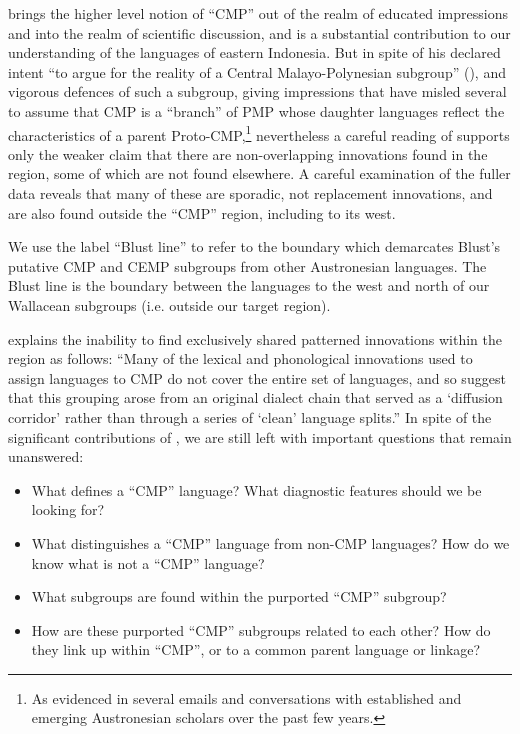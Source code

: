 \citet{Blust1993} brings the higher level notion of “CMP”
out of the realm of educated impressions
and into the realm of scientific discussion,
and is a substantial contribution to our understanding
of the  languages of eastern Indonesia.
But in spite of his declared intent
“to argue for the reality of a Central Malayo-Polynesian subgroup”
(\citeyear[244]{Blust1993}),
and vigorous defences of such a subgroup,
giving impressions that have misled several to assume that CMP
is a “branch” of PMP whose daughter languages reflect
the characteristics of a parent Proto-CMP,\footnote{
		As evidenced in several emails
		and conversations with established
		and emerging Austronesian scholars over the past few years.}
nevertheless a careful reading of \citet{Blust1993} supports only
the weaker claim that there are non-overlapping innovations found in the region,
some of which are not found elsewhere.
A careful examination of the fuller data reveals that many of these are sporadic,
not replacement innovations,
and are also found outside the “CMP” region,
including to its west.

We use the label “Blust line”
to refer to the boundary which demarcates Blust's
putative CMP and CEMP subgroups
from other Austronesian languages.
The Blust line is the boundary
between the languages to the west
and north of our Wallacean subgroups (i.e.
outside our target region).

\citet[32]{Blust2013} explains the inability to find exclusively
shared patterned innovations within the region as follows: “Many of the lexical
and phonological innovations used to assign languages
to CMP do not cover the entire set of languages,
and so suggest that this grouping arose from an original dialect chain
that served as a ‘diffusion corridor’ rather than through a series of ‘clean’ language splits.”
In spite of the significant contributions of
\citet{Blust1993,Blust2008,Blust2009,Blust2012b,Blust2013},
we are still left with important questions that remain unanswered:

\begin{itemize}
	\item[1.] What defines a “CMP” language? What diagnostic features should we be looking for?
	\item[2.] What distinguishes a “CMP” language from non-CMP languages?
						How do we know what is not a “CMP” language?
	\item[3.] What subgroups are found within the purported “CMP” subgroup?
	\item[4.] How are these purported “CMP” subgroups related to each other?
						How do they link up within “CMP”, or to a common parent language or linkage?
\end{itemize}

